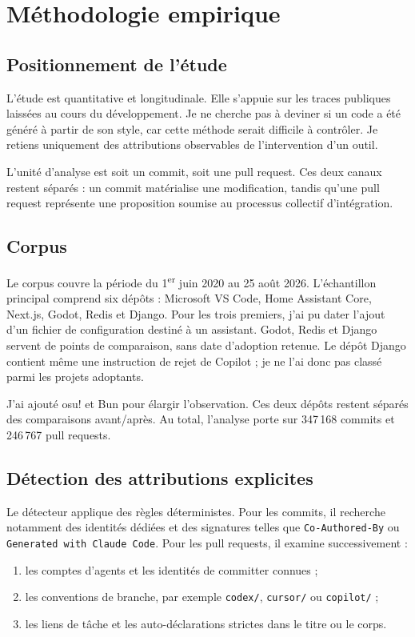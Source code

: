 \documentclass[12pt,a4paper,oneside]{report}
\begin{document}
\chapter{Méthodologie empirique}

\section{Positionnement de l'étude}

L'étude est quantitative et longitudinale. Elle s'appuie sur les traces publiques laissées au cours du développement. Je ne cherche pas à deviner si un code a été généré à partir de son style, car cette méthode serait difficile à contrôler. Je retiens uniquement des attributions observables de l'intervention d'un outil.

L'unité d'analyse est soit un commit, soit une pull request. Ces deux canaux restent séparés : un commit matérialise une modification, tandis qu'une pull request représente une proposition soumise au processus collectif d'intégration.

\section{Corpus}

Le corpus couvre la période du 1\textsuperscript{er} juin 2020 au 25 août 2026. L'échantillon principal comprend six dépôts : Microsoft VS Code, Home Assistant Core, Next.js, Godot, Redis et Django. Pour les trois premiers, j'ai pu dater l'ajout d'un fichier de configuration destiné à un assistant. Godot, Redis et Django servent de points de comparaison, sans date d'adoption retenue. Le dépôt Django contient même une instruction de rejet de Copilot ; je ne l'ai donc pas classé parmi les projets adoptants.

J'ai ajouté osu! et Bun pour élargir l'observation. Ces deux dépôts restent séparés des comparaisons avant/après. Au total, l'analyse porte sur 347\,168 commits et 246\,767 pull requests.

\section{Détection des attributions explicites}

Le détecteur applique des règles déterministes. Pour les commits, il recherche notamment des identités dédiées et des signatures telles que \texttt{Co-Authored-By} ou \texttt{Generated with Claude Code}. Pour les pull requests, il examine successivement :
\begin{enumerate}
  \item les comptes d'agents et les identités de committer connues ;
  \item les conventions de branche, par exemple \texttt{codex/}, \texttt{cursor/} ou \texttt{copilot/} ;
  \item les liens de tâche et les auto-déclarations strictes dans le titre ou le corps.
\end{enumerate}
\end{document}
